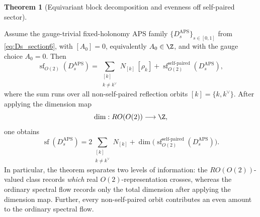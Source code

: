 \documentclass[11pt]{article}
\theoremstyle{definition}
\newtheorem{theorem}{Theorem}[section]
\DeclareMathOperator{\APS}{APS}
\numberwithin{equation}{section}
\begin{document}
\begin{theorem}[Equivariant block decomposition and evenness off self-paired sector]
\label{thm:evenness_off_wall_section6}

Assume the gauge-trivial fixed-holonomy APS family
\(\{D_s^{\APS}\}_{s\in[0,1]}\) from \eqref{eq:Ds_section6}, with \([A_0]=0\), equivalently \(A_0\in\Z\), and with the gauge choice \(A_0=0\). Then
\begin{equation}\label{eq:ROO2_sf_section6}
\operatorname{sf}_{O(2)}(D_s^{\APS})
=
\sum_{\substack{[k]\\ k\neq k^\vee}}
N_{[k]}\,[\rho_{k}]
+
\operatorname{sf}_{O(2)}^{\text{self-paired}}(D_s^{\APS}),
\end{equation}
where the sum runs over all non-self-paired reflection orbits \([k]=\{k,k^\vee\}\). After
applying the dimension map
\begin{equation}\label{eq:dimension_map_section6}
\dim:RO(O(2))\longrightarrow \Z,
\end{equation}
one obtains
\begin{equation}\label{eq:integer_sf_section6}
\operatorname{sf}(D_s^{\APS})
=
2\sum_{\substack{[k]\\ k\neq k^\vee}} N_{[k]}
+
\dim\!\bigl(\operatorname{sf}_{O(2)}^{\text{self-paired}}(D_s^{\APS})\bigr).
\end{equation}
In particular, the theorem separates two levels of information:
the \(RO(O(2))\)-valued class records \emph{which} real \(O(2)\)-representation crosses,
whereas the ordinary spectral flow records only the total dimension after applying the dimension map. Further, every non-self-paired orbit contributes an even amount to the ordinary
spectral flow.
\end{theorem}
\end{document}
